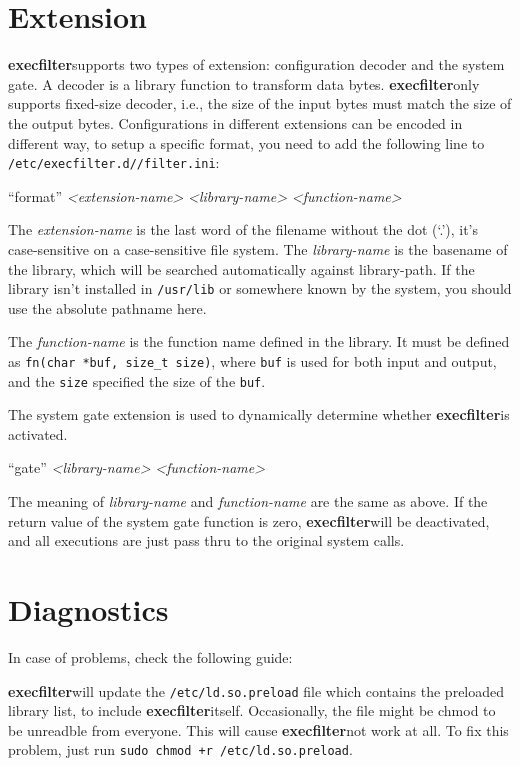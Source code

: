 \documentclass[hyperref, bookmark]{z-article}
\newcommand\code[1]{\texttt{#1}}
\newcommand\syntax[1]{
  \begin{mdframed}[
      linecolor=brown,
      linewidth=2pt,
    ]
    #1
  \end{mdframed}
}
\newcommand\xfilt{\textbf{execfilter}}
\newcommand\configdir{\texttt{/etc/execfilter.d/}}
\begin{document}
\section {Extension}

\xfilt supports two types of extension: configuration decoder and the system
gate. A decoder is a library function to transform data bytes. \xfilt only
supports fixed-size decoder, i.e., the size of the input bytes must match the
size of the output bytes. Configurations in different extensions can be encoded
in different way, to setup a specific format, you need to add the following line
to \code{\configdir/filter.ini}:

\syntax{
  ``format''
  \textit{<extension-name>}
  \textit{<library-name>}
  \textit{<function-name>}
}

The \textit{extension-name} is the last word of the filename without the dot
(`.'), it's case-sensitive on a case-sensitive file system. The
\textit{library-name} is the basename of the library, which will be searched
automatically against library-path. If the library isn't installed in
\code{/usr/lib} or somewhere known by the system, you should use the absolute
pathname here.

The \textit{function-name} is the function name defined in the library. It must
be defined as \code{fn(char *buf, size\_t size)}, where \code{buf} is used for
both input and output, and the \code{size} specified the size of the \code{buf}.

The system gate extension is used to dynamically determine whether \xfilt is
activated.

\syntax {
  ``gate''
  \textit{<library-name>}
  \textit{<function-name>}
}

The meaning of \textit{library-name} and \textit{function-name} are the same as
above. If the return value of the system gate function is zero, \xfilt will be
deactivated, and all executions are just pass thru to the original system calls.

\section {Diagnostics}

In case of problems, check the following guide:

\xfilt will update the \code{/etc/ld.so.preload} file which contains the
preloaded library list, to include \xfilt itself. Occasionally, the file might
be chmod to be unreadble from everyone.  This will cause \xfilt not work at
all. To fix this problem, just run \code{sudo chmod +r /etc/ld.so.preload}.
\end{document}
